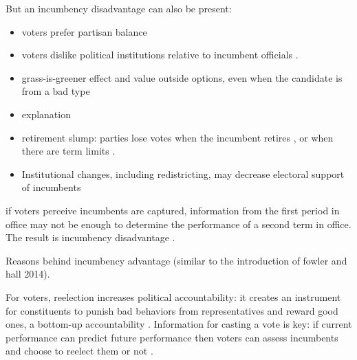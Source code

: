 \documentclass[12pt]{amsart}
\numberwithin{equation}{section}
\theoremstyle{definition}
\theoremstyle{definition}
\theoremstyle{definition}
\begin{document}
But an incumbency disadvantage can also be present: 
\begin{itemize}
	\item voters prefer partisan balance \citep{campbell_miller_1957, lewis_beck_2004, folke_snyder_2012}
	\item voters dislike political institutions relative to incumbent officials \citep{fenno_1975, parker_davidson_1979}. 
	\item grass-is-greener effect and value outside options, even when the candidate is from a bad type \citep{brenner_etal_2007, bordalo_etal_2012, bhaia_turan_2013}
	\item \citep{klasnja_titiunik_2017} explanation
	\item retirement slump: parties lose votes when the incumbent retires \citep{alford_brady_1989}, or when there are term limits \citep{ansolabehere_snyder_2004}. 
	\item Institutional changes, including redistricting, may decrease electoral support of incumbents \citep{ansolabehere_etal_2000, desposato_petrocik_2003} 

\end{itemize} 

if voters perceive incumbents are captured, information from the first period in office may not be enough to determine the performance of a second term in office. The result is incumbency disadvantage \citep{weaver_2020}.

Reasons behind incumbency advantage (similar to the introduction of fowler and hall 2014). 

For voters, reelection increases political accountability: it creates an instrument for constituents to punish bad behaviors from  representatives and reward good ones, a bottom-up accountability \citep{mansbridge_2009}. Information for casting a vote is key: if current performance can predict future performance then voters can assess incumbents and choose to reelect them or not \citep{ashworth_2012}.  
\end{document}
